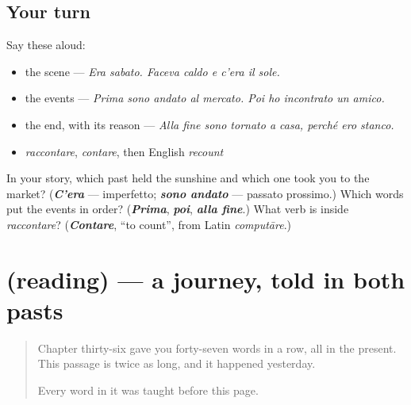 \subsection*{Your turn}
Say these aloud:

\begin{itemize}
\raggedright
  \item the scene — \emph{Era sabato. Faceva caldo e c'era il sole.}
  \item the events — \emph{Prima sono andato al mercato. Poi ho incontrato un amico.}
  \item the end, with its reason — \emph{Alla fine sono tornato a casa, perché ero stanco.}
  \item \emph{raccontare}, \emph{contare}, then English \emph{recount}
\end{itemize}

\begin{tcolorbox}[breakable,colback=teal!4,colframe=teal!35!black,title={Before you move on}]
In your story, which past held the sunshine and which one took you to the market? (\emph{\textbf{C'era}} — imperfetto; \emph{\textbf{sono andato}} — passato prossimo.) Which words put the events in order? (\emph{\textbf{Prima}}, \emph{\textbf{poi}}, \emph{\textbf{alla fine}}.) What verb is inside \emph{raccontare}? (\emph{\textbf{Contare}}, \textquotedblleft{}to count\textquotedblright{}, from Latin \emph{computāre}.)
\end{tcolorbox}
\section[(reading)]{(reading) — a journey, told in both pasts}

\label{lesson:IT-C264-lettura}



\begin{quote}
Chapter thirty-six gave you forty-seven words in a row, all in the present. This passage is twice as long, and it happened yesterday.

Every word in it was taught before this page.
\end{quote}

